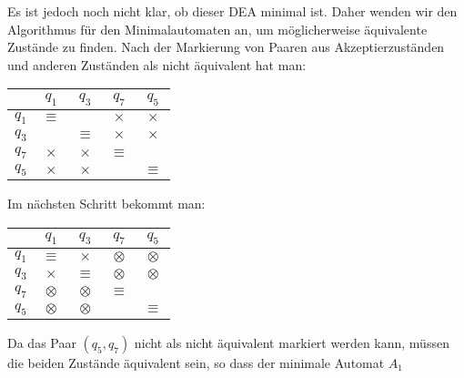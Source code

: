 \begin{loesung}
\begin{teilaufgaben}
Es ist jedoch noch nicht klar, ob dieser DEA minimal ist. Daher wenden
wir den Algorithmus für den Minimalautomaten an, um möglicherweise
äquivalente Zustände zu finden. Nach der Markierung von Paaren aus
Akzeptierzuständen und anderen Zuständen als nicht äquivalent hat man:
\begin{center}
\begin{tabular}{|c|cccc|}
\hline
     &$q_1$   &$q_3$   &$q_7$   &$q_5$\\
\hline
$q_1$&$\equiv$&        &$\times$&$\times$\\
$q_3$&        &$\equiv$&$\times$&$\times$\\
$q_7$&$\times$&$\times$&$\equiv$&        \\
$q_5$&$\times$&$\times$&        &$\equiv$\\
\hline
\end{tabular}
\end{center}
Im nächsten Schritt bekommt man:
\begin{center}
\begin{tabular}{|c|cccc|}
\hline
     &$q_1$    &$q_3$    &$q_7$    &$q_5$\\
\hline
$q_1$&$\equiv$ &$\times$ &$\otimes$&$\otimes$\\
$q_3$&$\times$ &$\equiv$ &$\otimes$&$\otimes$\\
$q_7$&$\otimes$&$\otimes$&$\equiv$ &        \\
$q_5$&$\otimes$&$\otimes$&         &$\equiv$\\
\hline
\end{tabular}
\end{center}
Da das Paar $(q_5,q_7)$  nicht als nicht äquivalent
markiert werden kann, müssen die beiden Zustände äquivalent sein,
so dass der minimale Automat $A_1$
\begin{center}
\end{center}
\end{teilaufgaben}
\end{loesung}
